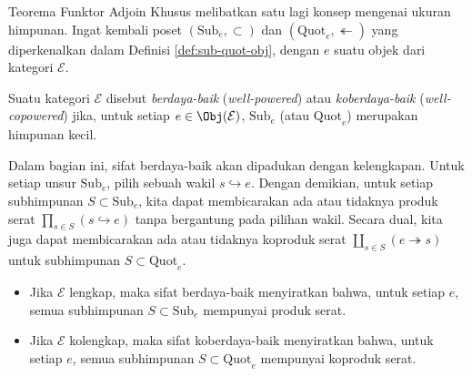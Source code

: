 Teorema Funktor Adjoin Khusus melibatkan satu lagi konsep mengenai ukuran
himpunan. Ingat kembali poset $(\mathrm{Sub}_e,\subset)$ dan
$(\mathrm{Quot}_e,\twoheadleftarrow)$ yang diperkenalkan dalam Definisi
\ref{def:sub-quot-obj}, dengan $e$ suatu objek dari kategori $\mathcal{E}$.

\begin{definisi}\label{def:well-powered}
	Suatu kategori $\mathcal{E}$ disebut \emph{berdaya-baik}
	(\emph{well-powered}) atau \emph{koberdaya-baik}
	(\emph{well-copowered}) jika, untuk setiap $e\in\Obj(\mathcal{E})$,
	$\mathrm{Sub}_e$ (atau $\mathrm{Quot}_e$) merupakan himpunan kecil.
\end{definisi}

Dalam bagian ini, sifat berdaya-baik akan dipadukan dengan kelengkapan. Untuk
setiap unsur $\mathrm{Sub}_e$, pilih sebuah wakil $s\hookrightarrow e$.
Dengan demikian, untuk setiap subhimpunan $S\subset\mathrm{Sub}_e$, kita
dapat membicarakan ada atau tidaknya produk serat
$\prod_{s\in S}\left(s\hookrightarrow e\right)$ tanpa bergantung pada
pilihan wakil. Secara dual, kita juga dapat membicarakan ada atau tidaknya
koproduk serat $\coprod_{s\in S}\left(e\twoheadrightarrow s\right)$ untuk
subhimpunan
$S\subset\mathrm{Quot}_e$.
\begin{itemize}
	\item Jika $\mathcal{E}$ lengkap, maka sifat berdaya-baik menyiratkan
	bahwa, untuk setiap $e$, semua subhimpunan $S\subset\mathrm{Sub}_e$
	mempunyai produk serat.
	\item Jika $\mathcal{E}$ kolengkap, maka sifat koberdaya-baik menyiratkan
	bahwa, untuk setiap $e$, semua subhimpunan $S\subset\mathrm{Quot}_e$
	mempunyai koproduk serat.
\end{itemize}

